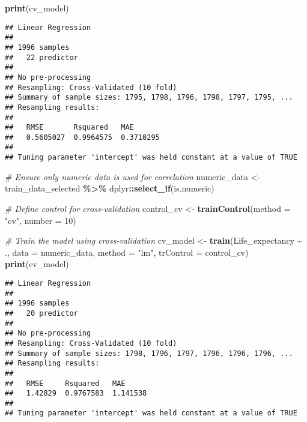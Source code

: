 \documentclass[
]{article}
\newenvironment{Shaded}{\begin{snugshade}}{\end{snugshade}}
\newcommand{\AttributeTok}[1]{\textcolor[rgb]{0.13,0.29,0.53}{#1}}
\newcommand{\CommentTok}[1]{\textcolor[rgb]{0.56,0.35,0.01}{\textit{#1}}}
\newcommand{\DecValTok}[1]{\textcolor[rgb]{0.00,0.00,0.81}{#1}}
\newcommand{\FunctionTok}[1]{\textcolor[rgb]{0.13,0.29,0.53}{\textbf{#1}}}
\newcommand{\NormalTok}[1]{#1}
\newcommand{\OtherTok}[1]{\textcolor[rgb]{0.56,0.35,0.01}{#1}}
\newcommand{\SpecialCharTok}[1]{\textcolor[rgb]{0.81,0.36,0.00}{\textbf{#1}}}
\newcommand{\StringTok}[1]{\textcolor[rgb]{0.31,0.60,0.02}{#1}}
\begin{document}
\begin{Shaded}
\begin{Highlighting}[]
\FunctionTok{print}\NormalTok{(cv\_model)}
\end{Highlighting}
\end{Shaded}

\begin{verbatim}
## Linear Regression 
## 
## 1996 samples
##   22 predictor
## 
## No pre-processing
## Resampling: Cross-Validated (10 fold) 
## Summary of sample sizes: 1795, 1798, 1796, 1798, 1797, 1795, ... 
## Resampling results:
## 
##   RMSE       Rsquared   MAE      
##   0.5605027  0.9964575  0.3710295
## 
## Tuning parameter 'intercept' was held constant at a value of TRUE
\end{verbatim}

\begin{Shaded}
\begin{Highlighting}[]
\CommentTok{\# Ensure only numeric data is used for correlation}
\NormalTok{numeric\_data }\OtherTok{\textless{}{-}}\NormalTok{ train\_data\_selected }\SpecialCharTok{\%\textgreater{}\%}\NormalTok{ dplyr}\SpecialCharTok{::}\FunctionTok{select\_if}\NormalTok{(is.numeric)}

\CommentTok{\# Define control for cross{-}validation}
\NormalTok{control\_cv }\OtherTok{\textless{}{-}} \FunctionTok{trainControl}\NormalTok{(}\AttributeTok{method =} \StringTok{"cv"}\NormalTok{, }\AttributeTok{number =} \DecValTok{10}\NormalTok{)}

\CommentTok{\# Train the model using cross{-}validation}
\NormalTok{cv\_model }\OtherTok{\textless{}{-}} \FunctionTok{train}\NormalTok{(Life\_expectancy }\SpecialCharTok{\textasciitilde{}}\NormalTok{ ., }\AttributeTok{data =}\NormalTok{ numeric\_data, }\AttributeTok{method =} \StringTok{"lm"}\NormalTok{, }\AttributeTok{trControl =}\NormalTok{ control\_cv)}
\FunctionTok{print}\NormalTok{(cv\_model)}
\end{Highlighting}
\end{Shaded}

\begin{verbatim}
## Linear Regression 
## 
## 1996 samples
##   20 predictor
## 
## No pre-processing
## Resampling: Cross-Validated (10 fold) 
## Summary of sample sizes: 1798, 1796, 1797, 1796, 1796, 1796, ... 
## Resampling results:
## 
##   RMSE     Rsquared   MAE     
##   1.42829  0.9767583  1.141538
## 
## Tuning parameter 'intercept' was held constant at a value of TRUE
\end{verbatim}
\end{document}

